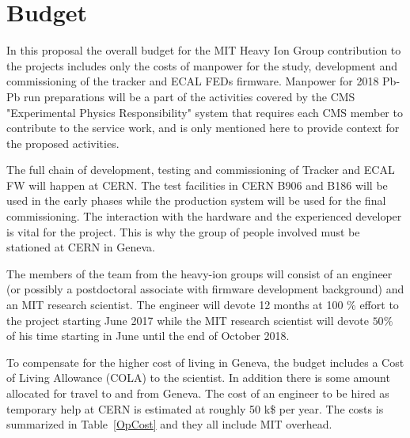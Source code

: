 \section{Budget}
\label{sec:funding}

In this proposal the overall budget for the MIT Heavy Ion Group contribution to the projects includes only the costs of manpower for the study, development and commissioning of the tracker and ECAL FEDs firmware. Manpower for 2018 Pb-Pb run preparations will be a part of the activities covered by the CMS "Experimental Physics Responsibility" system that requires each CMS member to contribute to the service work, and is only mentioned here to provide context for the proposed activities. 

The full chain of development, testing and commissioning of Tracker and ECAL FW will happen at CERN. The test facilities in CERN B906 and B186 will be used in the early phases while the production system will be used for the final commissioning. The interaction with the hardware and the experienced developer is vital for the project. This is why the group of people involved must be stationed at CERN in Geneva.

The members of the team from the heavy-ion groups will consist of an engineer (or possibly a postdoctoral associate with firmware development background)  and an MIT research scientist. The engineer will devote 12 months at 100 \% effort to the project starting June 2017 while the MIT research scientist will devote $50\%$ of his time starting in June until the end of October 2018. 
 
To compensate for the higher cost of living in Geneva, the budget includes a Cost of Living Allowance (COLA) to the scientist. In addition there is some amount allocated for travel to and from Geneva. The cost of an engineer to be hired as temporary help at CERN is estimated at roughly 50 k\$ per year. The costs is summarized in Table~\ref{OpCost} and they all include MIT overhead. 

